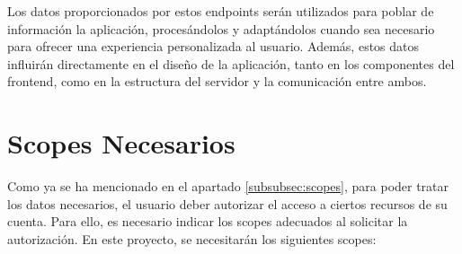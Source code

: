 



Los datos proporcionados por estos endpoints serán utilizados para poblar de información la aplicación, procesándolos y adaptándolos cuando sea necesario para ofrecer una experiencia personalizada al usuario. Además, estos datos influirán directamente en el diseño de la aplicación, tanto en los componentes del frontend, como en la estructura del servidor y la comunicación entre ambos.

\newpage

\section{Scopes Necesarios}

Como ya se ha mencionado en el apartado \ref{subsubsec:scopes}, para poder tratar los datos necesarios, el usuario deber autorizar el acceso a ciertos recursos de su cuenta. Para ello, es necesario indicar los scopes adecuados al solicitar la autorización. En este proyecto, se necesitarán los siguientes scopes:


